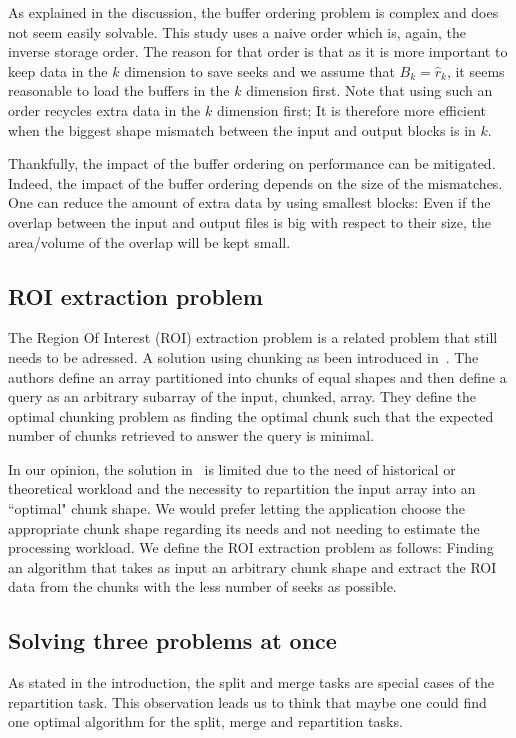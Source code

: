 \documentclass[sigconf, nonacm]{acmart}
\begin{document}
As explained in the discussion, the buffer ordering problem is complex and does
not seem easily solvable.
This study uses a naive order which is, again, the inverse storage order.
The reason for that order is that as it is more important to keep data in the
$k$ dimension to save seeks and we assume that $B_k=\hat r_k$, it seems
reasonable to load the buffers in the $k$ dimension first.
Note that using such
an order recycles extra data in the $k$ dimension first; It is therefore
more efficient when the biggest shape mismatch between the input and output
blocks is in $k$.

Thankfully, the impact of the buffer ordering on performance can be
mitigated. Indeed, the impact of the buffer ordering depends on the size of the
mismatches. One can reduce the amount of extra data by using smallest blocks: Even
if the overlap between the input and output files is big with respect to their
size, the area/volume of the overlap will be kept small.

\subsection{ROI extraction problem}
The Region Of Interest (ROI) extraction problem is a related problem that still
needs to be adressed.
A solution using chunking as been introduced in~\cite{optimal_chuking}.
The authors define an array partitioned into chunks of equal shapes and then
define a query as an arbitrary subarray of the input, chunked, array.
They define the optimal chunking problem as finding the optimal chunk such
that the expected number of chunks retrieved to answer the query is minimal.

In our opinion, the solution in~\cite{optimal_chuking} is limited due to the
need of historical or theoretical workload and the necessity to repartition the
input array into an ``optimal" chunk shape.
We would prefer letting the application choose the appropriate chunk shape
regarding its needs and not needing to estimate the processing workload.
We define the ROI extraction problem as follows: Finding an algorithm that takes
as input an arbitrary chunk shape and extract the ROI data from the chunks with
the less number of seeks as possible.

\subsection{Solving three problems at once}
As stated in the introduction, the split and merge tasks are special cases of
the repartition task. This observation leads us to think that maybe one could find
one optimal algorithm for the split, merge and repartition tasks.
\end{document}
